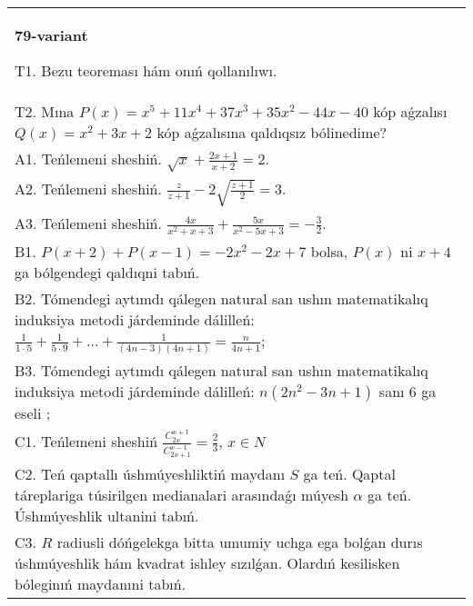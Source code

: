 \documentclass{article}
\begin{document}
\begin{tabular}{m{17cm}}
\textbf{79-variant}
\newline

T1. Bezu teoreması hám onıń qollanılıwı. \\
T2. Mına \(P(x) = x^{5} + 11x^{4} + 37x^{3} + 35x^{2} - 44x - 40\) kóp aǵzalısı \(Q(x) = x^{2} + 3x + 2\) kóp aǵzalısına qaldıqsız bólinedime? \\
A1. Teńlemeni sheshiń. \(\sqrt{x} + \frac{2x + 1}{x + 2} = 2\). \\
A2. Teńlemeni sheshiń. \(\frac{z}{z + 1} - 2\sqrt{\frac{z + 1}{2}} = 3\). \\
A3. Teńlemeni sheshiń. \(\frac{4x}{x^{2} + x + 3} + \frac{5x}{x^{2} - 5x + 3} = - \frac{3}{2}\). \\
B1. \(P(x + 2) + P(x - 1) = - 2x^{2} - 2x + 7\) bolsa, \(P(x)\) ni \(x + 4\) ga bólgendegi qaldıqni tabıń. \\
B2. Tómendegi aytımdı qálegen natural san ushın matematikalıq induksiya metodi járdeminde dálilleń: \(\frac{1}{1 \cdot 5} + \frac{1}{5 \cdot 9} + ... + \frac{1}{(4n - 3)(4n + 1)} = \frac{n}{4n + 1}\); \\
B3. Tómendegi aytımdı qálegen natural san ushın matematikalıq induksiya metodi járdeminde dálilleń: \(n\left( 2n^{2} - 3n + 1 \right)\) sanı 6 ga eseli ; \\
C1. Teńlemeni sheshiń \(\frac{C_{2x}^{x + 1}}{C_{2x + 1}^{x - 1}} = \frac{2}{3}\), \(x \in N\) \\
C2. Teń qaptallı úshmúyeshliktiń maydanı \(S\) ga teń. Qaptal táreplariga túsirilgen medianalari arasındaǵı múyesh \(\alpha\) ga teń. Úshmúyeshlik ultanini tabıń. \\
C3. \(R\) radiusli dóńgelekga bitta umumiy uchga ega bolǵan durıs úshmúyeshlik hám kvadrat ishley sızılǵan. Olardıń kesilisken bóleginıń maydanıni tabıń. \\

\end{tabular}
\vspace{1cm}
\end{document}
